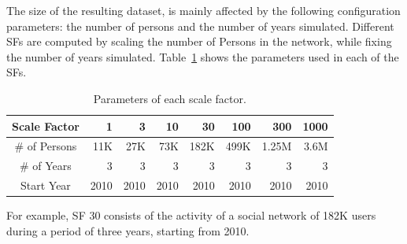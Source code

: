 The size of the resulting dataset, is mainly affected by the following
configuration parameters: the number of persons and the number of years
simulated. Different SFs are computed by scaling the number of Persons in
the network, while fixing the number of years simulated.
Table~\ref{tab:snsize} shows the parameters used in each of the SFs.

\begin{table}[H]
\centering
\begin{tabular}{|c||r|r|r|r|r|r|r|}
\hline  Scale Factor  & 1 &  3 & 10 & 30 & 100 & 300 & 1000 \\
\hline  \# of Persons  & 11K &  27K & 73K & 182K & 499K & 1.25M & 3.6M \\
\hline  \# of Years  & 3 &  3 & 3 & 3 & 3 & 3 & 3 \\
\hline  Start Year & 2010 &  2010 & 2010 & 2010 & 2010 & 2010 & 2010 \\
\hline
\end{tabular}
\centering
\caption{Parameters of each scale factor.}
\label{tab:snsize}
\end{table}

For example, SF 30 consists of the activity of a social network of 182K users
during a period of three years, starting from 2010. 


